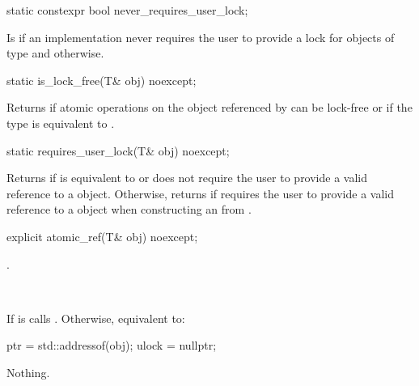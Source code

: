 \begin{addedblock}
\begin{itemdecl}
static constexpr bool never_requires_user_lock;
\end{itemdecl}

\begin{itemdescr}
\pnum
Is  if an implementation never requires the user to provide a 
lock for objects of type  and  otherwise.
\end{itemdescr}


\begin{itemdecl}
static is_lock_free(T& obj) noexcept;
\end{itemdecl}

\begin{itemdescr}
\returns Returns  if atomic operations on the object referenced by
 can be lock-free or if the  type is equivalent to 
.
\end{itemdescr}


\begin{itemdecl}
static requires_user_lock(T& obj) noexcept;
\end{itemdecl}

\begin{itemdescr}
\returns Returns  if  is equivalent to
 or does not require the user to provide
a valid reference to a  object.
Otherwise, returns  if  requires the user to
provide a valid reference to a  object 
when constructing an  from . 
\end{itemdescr}
\end{addedblock}


\begin{itemdecl}
explicit atomic_ref(T& obj) noexcept;
\end{itemdecl}

\begin{itemdescr}
\pnum
{}.

\pnum
\effects {}\\
\begin{addedblock}
If  is  calls .
Otherwise, equivalent to:
\begin{codeblock}
  ptr = std::addressof(obj);
  ulock = nullptr;
\end{codeblock}
\end{addedblock}

\pnum
\throws Nothing.
 
\end{itemdescr}


